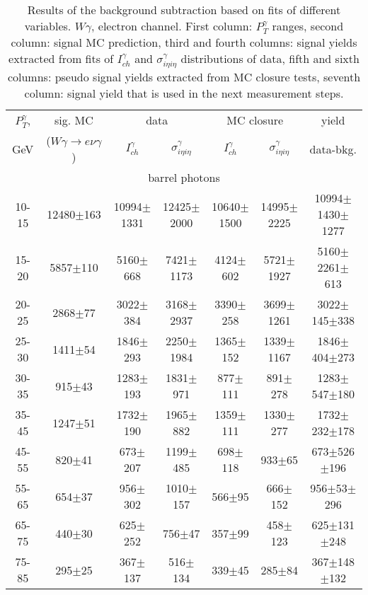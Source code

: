 \begin{table}[h]
  \tiny
  \begin{center}
  \caption{Results of the background subtraction based on fits of different variables. $W\gamma$, electron channel. First column: $P_T^{\gamma}$ ranges, second column: signal MC prediction, third and fourth columns: signal yields extracted from fits of $I_{ch}^{\gamma}$ and $\sigma_{i\eta i\eta}^\gamma$ distributions of data, fifth and sixth columns: pseudo signal yields extracted from MC closure tests, seventh column: signal yield that is used in the next measurement steps.}
  \begin{tabular}{|c|c|c|c|c|c|c|}
    $P_T^{\gamma}$, &  sig. MC   & \multicolumn{2}{|c|}{data}  & \multicolumn{2}{|c|}{MC closure} & yield\\ 
    GeV & ($W\gamma\rightarrow e\nu\gamma$) & $I_{ch}^{\gamma}$ & $\sigma_{i\eta i\eta}^\gamma$  & $I_{ch}^{\gamma}$  & $\sigma_{i\eta i\eta}^\gamma$   & data-bkg. \\ \hline
    \multicolumn{7}{|c|}{barrel photons} \\ \hline
    10-15 & 12480$\pm$163 & 10994$\pm$1331 & 12425$\pm$2000 & 10640$\pm$1500 & 14995$\pm$2225 &10994$\pm$1430$\pm$1277  \\ \hline
    15-20 & 5857$\pm$110 & 5160$\pm$668 & 7421$\pm$1173 & 4124$\pm$602 & 5721$\pm$1927 &5160$\pm$2261$\pm$613  \\ \hline
    20-25 & 2868$\pm$77 & 3022$\pm$384 & 3168$\pm$2937 & 3390$\pm$258 & 3699$\pm$1261 &3022$\pm$145$\pm$338  \\ \hline
    25-30 & 1411$\pm$54 & 1846$\pm$293 & 2250$\pm$1984 & 1365$\pm$152 & 1339$\pm$1167 &1846$\pm$404$\pm$273  \\ \hline
    30-35 & 915$\pm$43 & 1283$\pm$193 & 1831$\pm$971 & 877$\pm$111 & 891$\pm$278 &1283$\pm$547$\pm$180  \\ \hline
    35-45 & 1247$\pm$51 & 1732$\pm$190 & 1965$\pm$882 & 1359$\pm$111 & 1330$\pm$277 &1732$\pm$232$\pm$178  \\ \hline
    45-55 & 820$\pm$41 & 673$\pm$207 & 1199$\pm$485 & 698$\pm$118 & 933$\pm$65 &673$\pm$526$\pm$196  \\ \hline
    55-65 & 654$\pm$37 & 956$\pm$302 & 1010$\pm$157 & 566$\pm$95 & 666$\pm$152 &956$\pm$53$\pm$296  \\ \hline
    65-75 & 440$\pm$30 & 625$\pm$252 & 756$\pm$47 & 357$\pm$99 & 458$\pm$123 &625$\pm$131$\pm$248  \\ \hline
    75-85 & 295$\pm$25 & 367$\pm$137 & 516$\pm$134 & 339$\pm$45 & 285$\pm$84 &367$\pm$148$\pm$132  \\ \hline

\end{tabular}
\end{center}
\end{table}
